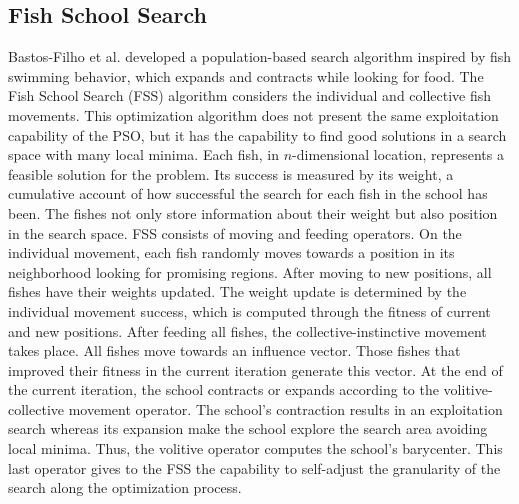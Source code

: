 \documentclass[runningheads]{llncs}
\begin{document}
\subsection{Fish School Search}
Bastos-Filho et al. \cite{bastos2008novel} developed a population-based search algorithm inspired by fish swimming behavior, which expands and contracts while looking for food. The Fish School Search (FSS) algorithm considers the individual and collective fish movements. This optimization algorithm does not present the same exploitation capability of the PSO, but it has the capability to find good solutions in a search space with many local minima.
Each fish, in \(n\)-dimensional location, represents a feasible solution for the problem. Its success is measured by its weight, a cumulative account of how successful the search for each fish in the school has been. The fishes not only store information about their weight but also position in the search space.
FSS consists of moving and feeding operators. On the individual movement, each fish randomly moves towards a position in its neighborhood looking for promising regions. After moving to new positions, all fishes have their weights updated. The weight update is determined by the individual movement success, which is computed through the fitness of current and new positions. After feeding all fishes, the collective-instinctive movement takes place. All fishes move towards an influence vector. Those fishes that improved their fitness in the current iteration generate this vector.
At the end of the current iteration, the school contracts or expands according to the volitive-collective movement operator. The school's contraction results in an exploitation search whereas its expansion make the school explore the search area avoiding local minima. Thus, the volitive operator computes the school's barycenter. This last operator gives to the FSS the capability to self-adjust the granularity of the search along the optimization process.



\end{document}
